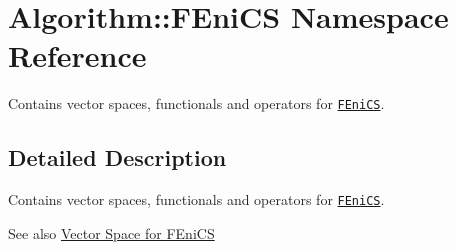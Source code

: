 \hypertarget{namespaceAlgorithm_1_1FEniCS}{}\section{Algorithm\+:\+:F\+Eni\+C\+S Namespace Reference}
\label{namespaceAlgorithm_1_1FEniCS}


Contains vector spaces, functionals and operators for \href{www.fenicsproject.org}{\tt F\+Eni\+C\+S}.  




\subsection{Detailed Description}
Contains vector spaces, functionals and operators for \href{www.fenicsproject.org}{\tt F\+Eni\+C\+S}. 

\begin{DoxySeeAlso}{See also}
\hyperlink{group__FenicsGroup}{Vector Space for F\+Eni\+C\+S} 
\end{DoxySeeAlso}
